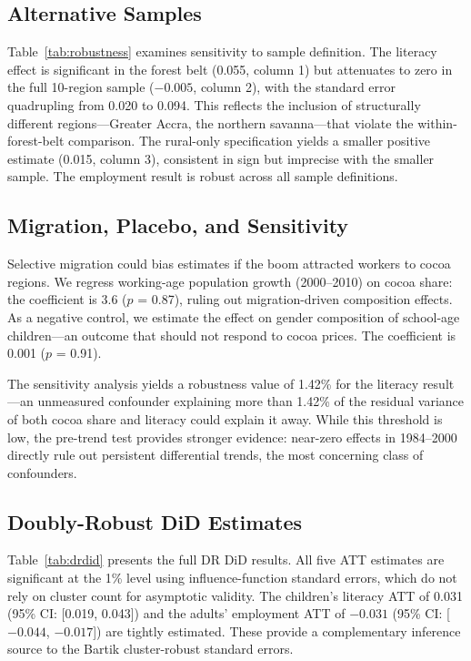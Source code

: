 \documentclass[12pt]{article}
\begin{document}
\subsection{Alternative Samples}



Table~\ref{tab:robustness} examines sensitivity to sample definition. The literacy effect is significant in the forest belt (0.055, column 1) but attenuates to zero in the full 10-region sample ($-0.005$, column 2), with the standard error quadrupling from 0.020 to 0.094. This reflects the inclusion of structurally different regions---Greater Accra, the northern savanna---that violate the within-forest-belt comparison. The rural-only specification yields a smaller positive estimate (0.015, column 3), consistent in sign but imprecise with the smaller sample. The employment result is robust across all sample definitions.

\subsection{Migration, Placebo, and Sensitivity}

Selective migration could bias estimates if the boom attracted workers to cocoa regions. We regress working-age population growth (2000--2010) on cocoa share: the coefficient is 3.6 ($p$ = 0.87), ruling out migration-driven composition effects. As a negative control, we estimate the effect on gender composition of school-age children---an outcome that should not respond to cocoa prices. The coefficient is 0.001 ($p$ = 0.91).

The \citet{cinelli2020} sensitivity analysis yields a robustness value of 1.42\% for the literacy result---an unmeasured confounder explaining more than 1.42\% of the residual variance of both cocoa share and literacy could explain it away. While this threshold is low, the pre-trend test provides stronger evidence: near-zero effects in 1984--2000 directly rule out persistent differential trends, the most concerning class of confounders.

\subsection{Doubly-Robust DiD Estimates}



Table~\ref{tab:drdid} presents the full DR DiD results. All five ATT estimates are significant at the 1\% level using influence-function standard errors, which do not rely on cluster count for asymptotic validity. The children's literacy ATT of 0.031 (95\% CI: [0.019, 0.043]) and the adults' employment ATT of $-0.031$ (95\% CI: [$-0.044$, $-0.017$]) are tightly estimated. These provide a complementary inference source to the Bartik cluster-robust standard errors.
\end{document}
